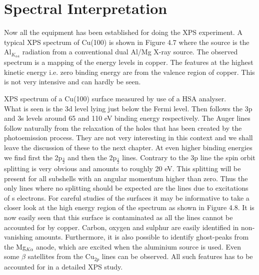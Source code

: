 \section{Spectral Interpretation}

          Now all the equipment has been established for doing the XPS
          experiment. A typical XPS spectrum of Cu(100) is shown in
          Figure 4.7 where the source is the Al$_{K_{\alpha 4}}$
          radiation from a conventional dual Al/Mg X-ray source. The
          observed spectrum is a mapping of the energy levels in
          copper. The features at the highest kinetic energy i.e. zero
          binding energy are from the valence region of copper. This
          is not very intensive and can hardly be seen.\\

\vspace*{12cm}

 XPS spectrum of a Cu(100) surface measured
          by use of a HSA analyser.\\

             What is seen is the 3d level lying just below the Fermi
          level. Then follows the 3p and 3s levels around 65 and 110
          eV binding  energy  respectively.  The  Auger  lines  follow
          naturally from the relaxation of the  holes  that  has  been
          created by the photoemission  process.  They  are  not  very
          interesting  in  this  context  and  we  shall   leave   the
          discussion of these to the  next  chapter.  At  even  higher
          binding energies we find first  the  2p$_{\frac{3}{2}}$  and
          then the 2p$_{\frac{1}{2}}$ lines. Contrary to the  3p  line
          the spin orbit splitting is  very  obvious  and  amounts  to
          roughly 20 eV.  This  splitting  will  be  present  for  all
          subshells with an angular momentum higher  than  zero.  Thus
          the only lines where no splitting should be expected are the
          lines due to excitations of s electrons. For careful studies
          of the surfaces it may be informative to take a closer  look
          at the high energy region of the spectrum as shown in Figure
          4.8. It is now easily seen that this surface is contaminated
          as all the lines cannot be accounted for by  copper.  Carbon,
          oxygen and sulphur are  easily  identified  in  non-vanishing
          amounts.  Furthermore,  it  is  also  possible  to  identify
          ghost-peaks from the Mg$_{K\alpha}$ anode, which are excited
          when the aluminium source is used. Even some $\beta$
          satellites from the Cu$_{2p}$ lines can be observed. All
          such features has to be accounted for in a detailed XPS
          study.\\

